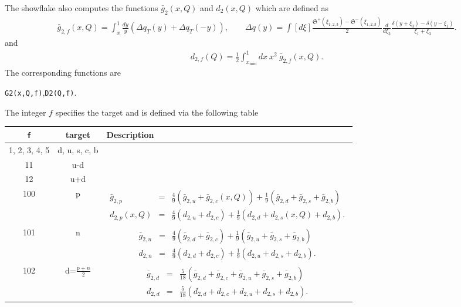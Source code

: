 \documentclass[prd,nofootinbib,eqsecnum,final]{revtex4}
\newcommand{\nn}{\nonumber}
\renewcommand{\(}{\left(}
\renewcommand{\)}{\right)}
\renewcommand{\[}{\left[}
\renewcommand{\]}{\right]}
\begin{document}
The showflake also computes the functions $\bar g_2(x,Q)$ and $d_2(x,Q)$ which are defined as
\begin{eqnarray}
\bar g_{2,f}(x,Q)=\int_x^1 \frac{dy}{y}\(\Delta q_T(y)+\Delta q_T(-y)\),\qquad \Delta q(y)=\int [d\xi]\frac{\mathfrak{S}^+(\xi_{1,2,3})-\mathfrak{S}^-(\xi_{1,2,3})}{2}\frac{d}{d\xi_3}\frac{\delta(y+\xi_3)-\delta(y-\xi_1)}{\xi_1+\xi_3}.
\end{eqnarray}
and
\begin{eqnarray}
d_{2,f}(Q)=\frac{1}{2}\int_{x_{\min}}^1 dx ~x^2 ~\bar g_{2,f}(x,Q).
\end{eqnarray}
The corresponding functions are
\begin{center}
\texttt{G2(x,Q,f)},\qquad \texttt{D2(Q,f)}.
\end{center}

The integer $f$ specifies the target and is defined via the following table
\begin{longtable}{||c|c|p{12cm}||}
\texttt{f} & target & Description
\\
\hline\hline
1, 2, 3, 4, 5 & d, u, s, c, b & 
\\\hline
11 & u-d & 
\\\hline
12 & u+d & 
\\\hline
100 & p & \begin{eqnarray}\nn
\bar g_{2,p}&=&\frac{4}{9}\(\bar g_{2,u}+\bar g_{2,c}(x,Q)\)+\frac{1}{9}\(\bar g_{2,d}+\bar g_{2,s}+\bar g_{2,b}\)
\\\nn
d_{2,p}(x,Q)&=&\frac{4}{9}\(d_{2,u}+d_{2,c}\)+\frac{1}{9}\(d_{2,d}+d_{2,s}(x,Q)+d_{2,b}\).
\end{eqnarray}
\\\hline
101 & n & \begin{eqnarray}\nn
\bar g_{2,n}&=&\frac{4}{9}\(\bar g_{2,d}+\bar g_{2,c}\)+\frac{1}{9}\(\bar g_{2,u}+\bar g_{2,s}+\bar g_{2,b}\)
\\\nn
d_{2,n}&=&\frac{4}{9}\(d_{2,d}+d_{2,c}\)+\frac{1}{9}\(d_{2,u}+d_{2,s}+d_{2,b}\).
\end{eqnarray}
\\\hline
102 & d=$\frac{p+n}{2}$ & \begin{eqnarray}\nn
\bar g_{2,d}&=&\frac{5}{18}\(\bar g_{2,d}+\bar g_{2,c}+\bar g_{2,u}+\bar g_{2,s}+\bar g_{2,b}\)
\\\nn
d_{2,d}&=&\frac{5}{18}\(d_{2,d}+d_{2,c}+d_{2,u}+d_{2,s}+d_{2,b}\).
\end{eqnarray}
\\\hline\hline
\end{longtable}
\end{document}
